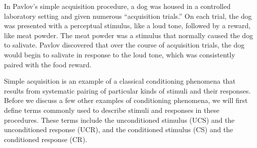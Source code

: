 \documentclass[
  oneside,
  12pt]{crumpbook}
\begin{document}
In Pavlov's simple acquisition procedure, a dog was housed in a controlled laboratory setting and given numerous ``acquisition trials.'' On each trial, the dog was presented with a perceptual stimulus, like a loud tone, followed by a reward, like meat powder. The meat powder was a stimulus that normally caused the dog to salivate. Pavlov discovered that over the course of acquisition trials, the dog would begin to salivate in response to the loud tone, which was consistently paired with the food reward.

Simple acquisition is an example of a classical conditioning phenomena that results from systematic pairing of particular kinds of stimuli and their responses. Before we discuss a few other examples of conditioning phenomena, we will first define terms commonly used to describe stimuli and responses in these procedures. These terms include the unconditioned stimulus (UCS) and the unconditioned response (UCR), and the conditioned stimulus (CS) and the conditioned response (CR).
\end{document}
